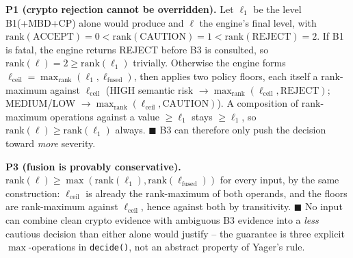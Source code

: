 \documentclass[conference]{IEEEtran}
\begin{document}
\textbf{P1 (crypto rejection cannot be overridden).} Let $\ell_1$ be the level B1(+MBD+CP) alone would produce and $\ell$ the engine's final level, with $\mathrm{rank}(\text{ACCEPT}){=}0{<}\mathrm{rank}(\text{CAUTION}){=}1{<}\mathrm{rank}(\text{REJECT}){=}2$. If B1 is fatal, the engine returns REJECT before B3 is consulted, so $\mathrm{rank}(\ell){=}2\ge\mathrm{rank}(\ell_1)$ trivially. Otherwise the engine forms $\ell_{\text{ceil}}{=}\max_{\mathrm{rank}}(\ell_1,\ell_{\text{fused}})$, then applies two policy floors, each itself a rank-maximum against $\ell_{\text{ceil}}$ (HIGH semantic risk $\to\max_{\mathrm{rank}}(\ell_{\text{ceil}},\text{REJECT})$; MEDIUM/LOW $\to\max_{\mathrm{rank}}(\ell_{\text{ceil}},\text{CAUTION})$). A composition of rank-maximum operations against a value $\ge\ell_1$ stays $\ge\ell_1$, so $\mathrm{rank}(\ell)\ge\mathrm{rank}(\ell_1)$ always. $\blacksquare$ B3 can therefore only push the decision toward \emph{more} severity.

\textbf{P3 (fusion is provably conservative).} $\mathrm{rank}(\ell)\ge\max(\mathrm{rank}(\ell_1),\mathrm{rank}(\ell_{\text{fused}}))$ for every input, by the same construction: $\ell_{\text{ceil}}$ is already the rank-maximum of both operands, and the floors are rank-maximum against $\ell_{\text{ceil}}$, hence against both by transitivity. $\blacksquare$ No input can combine clean crypto evidence with ambiguous B3 evidence into a \emph{less} cautious decision than either alone would justify -- the guarantee is three explicit $\max$-operations in \texttt{decide()}, not an abstract property of Yager's rule.
\end{document}
